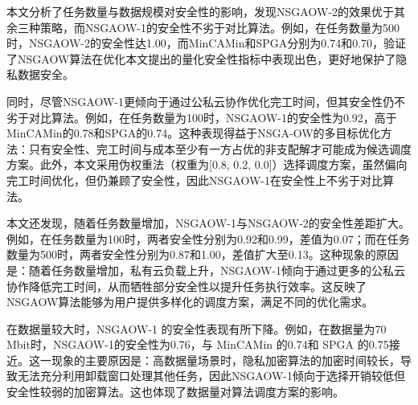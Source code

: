 本文分析了任务数量与数据规模对安全性的影响，发现NSGAOW-2的效果优于其余三种策略，而NSGAOW-1的安全性不劣于对比算法。例如，在任务数量为500时，NSGAOW-2的安全性达1.00，而MinCAMin和SPGA分别为0.74和0.70，验证了NSGAOW算法在优化本文提出的量化安全性指标中表现出色，更好地保护了隐私数据安全。

同时，尽管NSGAOW-1更倾向于通过公私云协作优化完工时间，但其安全性仍不劣于对比算法。例如，在任务数量为100时，NSGAOW-1的安全性为0.92，高于MinCAMin的0.78和SPGA的0.74。这种表现得益于NSGA-OW的多目标优化方法：只有安全性、完工时间与成本至少有一方占优的非支配解才可能成为候选调度方案。此外，本文采用伪权重法（权重为[0.8, 0.2, 0.0]）选择调度方案，虽然偏向完工时间优化，但仍兼顾了安全性，因此NSGAOW-1在安全性上不劣于对比算法。

本文还发现，随着任务数量增加，NSGAOW-1与NSGAOW-2的安全性差距扩大。例如，在任务数量为100时，两者安全性分别为0.92和0.99，差值为0.07；而在任务数量为500时，两者安全性分别为0.87和1.00，差值扩大至0.13。这种现象的原因是：随着任务数量增加，私有云负载上升，NSGAOW-1倾向于通过更多的公私云协作降低完工时间，从而牺牲部分安全性以提升任务执行效率。这反映了NSGAOW算法能够为用户提供多样化的调度方案，满足不同的优化需求。

在数据量较大时，NSGAOW-1 的安全性表现有所下降。例如，在数据量为70 Mbit时，NSGAOW-1的安全性为0.76，与 MinCAMin 的0.74和 SPGA 的0.75接近。这一现象的主要原因是：高数据量场景时，隐私加密算法的加密时间较长，导致无法充分利用卸载窗口处理其他任务，因此NSGAOW-1倾向于选择开销较低但安全性较弱的加密算法。这也体现了数据量对算法调度方案的影响。

